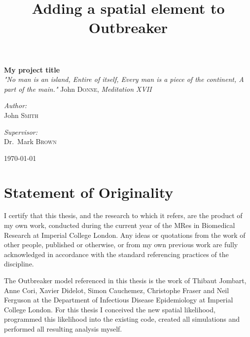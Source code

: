 \documentclass[11pt,a4paper]{report}
\title{Adding a spatial element to Outbreaker}
\begin{document}
\begin{titlepage}
\begin{center}
{ \huge \bfseries My project title \\[0.4cm]}
\vfill
\emph{
"No man is an island,
Entire of itself, \newline
Every man is a piece of the continent,
A part of the main."}\newline
John \textsc{Donne}, \emph{Meditation XVII}

\vfill

\noindent
\begin{minipage}{0.4\textwidth}
\begin{flushleft} \large
\emph{Author:}\\
John \textsc{Smith}
\end{flushleft}
\end{minipage}%
\begin{minipage}{0.4\textwidth}
\begin{flushright} \large
\emph{Supervisor:} \\
Dr.~Mark \textsc{Brown}
\end{flushright}
\end{minipage}

\vfill

{\large \today}


\end{center}
\end{titlepage}




\chapter*{Statement of Originality}
\thispagestyle{empty}
\noindent I certify that this thesis, and the research to which it refers, are the product of my own work, conducted during the current year of the MRes in Biomedical Research at Imperial College London. Any ideas or quotations from the work of other people, published or otherwise, or from my own previous work are fully acknowledged in accordance with the standard referencing practices of the discipline. 


The Outbreaker model referenced in this thesis is the work of Thibaut Jombart, Anne Cori, Xavier Didelot, Simon Cauchemez, Christophe Fraser and Neil Ferguson at the Department of Infectious Disease Epidemiology at Imperial College London. For this thesis I conceived the new spatial likelihood, programmed this likelihood into the existing code, created all simulations and performed all resulting analysis myself.
\newpage
\end{document}
